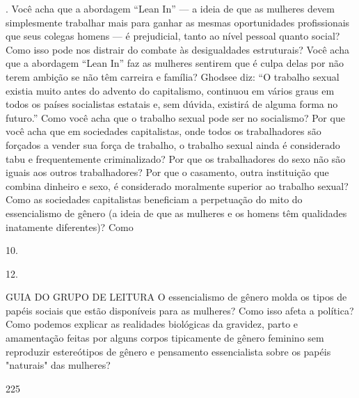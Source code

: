 . Você acha que a abordagem “Lean In” — a ideia de que as mulheres devem simplesmente trabalhar mais para ganhar as mesmas oportunidades profissionais que seus colegas homens — é prejudicial, tanto ao nível pessoal quanto social? Como isso pode nos distrair do combate às desigualdades estruturais? Você acha que a abordagem “Lean In” faz as mulheres sentirem que é culpa delas por não terem ambição se não têm carreira e família? Ghodsee diz: “O trabalho sexual existia muito antes do advento do capitalismo, continuou em vários graus em todos os países socialistas estatais e, sem dúvida, existirá de alguma forma no futuro.” Como você acha que o trabalho sexual pode ser no socialismo? Por que você acha que em sociedades capitalistas, onde todos os trabalhadores são forçados a vender sua força de trabalho, o trabalho sexual ainda é considerado tabu e frequentemente criminalizado? Por que os trabalhadores do sexo não são iguais aos outros trabalhadores? Por que o casamento, outra instituição que combina dinheiro e sexo, é considerado moralmente superior ao trabalho sexual? Como as sociedades capitalistas beneficiam a perpetuação do mito do essencialismo de gênero (a ideia de que as mulheres e os homens têm qualidades inatamente diferentes)? Como
 \par 
10.
 \par 
12.
 \par 
GUIA DO GRUPO DE LEITURA O essencialismo de gênero molda os tipos de papéis sociais que estão disponíveis para as mulheres? Como isso afeta a política? Como podemos explicar as realidades biológicas da gravidez, parto e amamentação feitas por alguns corpos tipicamente de gênero feminino sem reproduzir estereótipos de gênero e pensamento essencialista sobre os papéis "naturais" das mulheres?
 \par 

 \par 
225